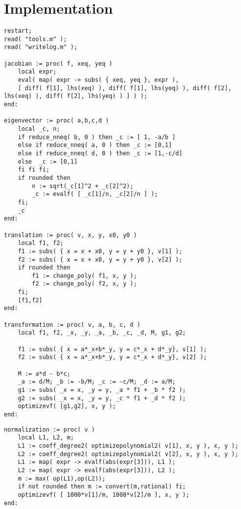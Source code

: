 \documentclass[a4paper,10pt]{article}
\begin{document}
\section{Implementation}

\begin{lstlisting}[name=type]
restart;
read( "tools.m" );
read( "writelog.m" );

jacobian := proc( f, xeq, yeq )
    local expr;
    eval( map( expr -> subs( { xeq, yeq }, expr ),
    [ diff( f[1], lhs(xeq) ), diff( f[1], lhs(yeq) ), diff( f[2], lhs(xeq) ), diff( f[2], lhs(yeq) ) ] ) );
end:

eigenvector := proc( a,b,c,d )
    local _c, n;
    if reduce_nneq( b, 0 ) then _c := [ 1, -a/b ]
    else if reduce_nneq( a, 0 ) then _c := [0,1]
    else if reduce_nneq( d, 0 ) then _c := [1,-c/d]
    else  _c := [0,1]
    fi fi fi;
    if rounded then
        n := sqrt(_c[1]^2 + _c[2]^2);
        _c := evalf( [ _c[1]/n, _c[2]/n ] );
    fi;
    _c
end:

translation := proc( v, x, y, x0, y0 )
    local f1, f2;
    f1 := subs( { x = x + x0, y = y + y0 }, v[1] );
    f2 := subs( { x = x + x0, y = y + y0 }, v[2] );
    if rounded then
        f1 := change_poly( f1, x, y );
        f2 := change_poly( f2, x, y );
    fi;
    [f1,f2]
end:

transformation := proc( v, a, b, c, d )
    local f1, f2, _x, _y, _a, _b, _c, _d, M, g1, g2;

    f1 := subs( { x = a*_x+b*_y, y = c*_x + d*_y}, v[1] );
    f2 := subs( { x = a*_x+b*_y, y = c*_x + d*_y}, v[2] );

    M := a*d - b*c;
    _a := d/M; _b := -b/M; _c := -c/M; _d := a/M;
    g1 := subs( _x = x, _y = y, _a * f1 + _b * f2 );
    g2 := subs( _x = x, _y = y, _c * f1 + _d * f2 );
    optimizevf( [g1,g2], x, y );
end:
\end{lstlisting}

\begin{lstlisting}[name=type]
normalization := proc( v )
    local L1, L2, m;
    L1 := coeff_degree2( optimizepolynomial2( v[1], x, y ), x, y );
    L2 := coeff_degree2( optimizepolynomial2( v[2], x, y ), x, y );
    L1 := map( expr -> evalf(abs(expr[3])), L1 );
    L2 := map( expr -> evalf(abs(expr[3])), L2 );
    m := max( op(L1),op(L2));
    if not rounded then m := convert(m,rational) fi;
    optimizevf( [ 1000*v[1]/m, 1000*v[2]/m ], x, y );
end:
\end{lstlisting}
\end{document}
